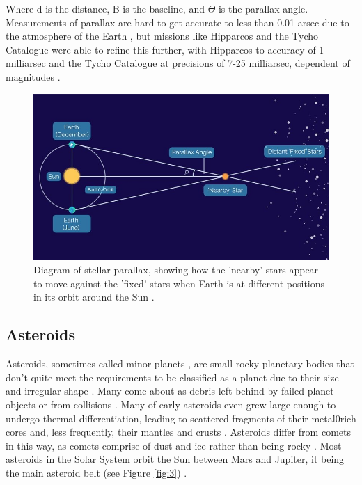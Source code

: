 \documentclass[12pt]{article}
\begin{document}
Where d is the distance, B is the baseline, and $\Theta$ is the parallax angle.
Measurements of parallax are hard to get accurate to less than 0.01 arsec due to the atmosphere of the Earth \cite{lcoparallax}, but missions like Hipparcos and the Tycho Catalogue were able to refine this further, with Hipparcos to accuracy of 1 milliarsec \cite{perryman1997hipparcos}
and the Tycho Catalogue at precisions of 7-25 milliarsec, dependent of magnitudes \cite{hog1997tycho}.

\begin{figure}[H]
    \centering
    \includegraphics[width=.75\textwidth]{parallax.jpg}
    \caption{Diagram of stellar parallax, showing how the 'nearby' stars appear to move against the 'fixed' stars when Earth is at different positions in its orbit around the Sun \protect\cite{lcoparallax}.}
    \label{fig:2}
\end{figure}

\subsection{Asteroids}

Asteroids, sometimes called minor planets \cite{nasaasteroid}, are small rocky planetary bodies \cite{asphaug2009growth} that don't quite meet the requirements to be classified as a planet due to their size and irregular shape \cite{hubbleasteroid}.
Many come about as debris left behind by failed-planet objects or from collisions \cite{hubbleasteroid,nasaasteroid,asphaug2009growth}. Many of early asteroids even grew large enough to undergo thermal differentiation, leading to scattered fragments of their metal0rich cores and, less
frequently, their mantles and crusts \cite{asphaug2009growth}. Asteroids differ from comets in this way, as comets comprise of dust and ice rather than being rocky \cite{hubbleasteroid}.
Most asteroids in the Solar System orbit the Sun between Mars and Jupiter, it being the main asteroid belt (see Figure \ref{fig:3}) \cite{nasaasteroid}.
\end{document}
